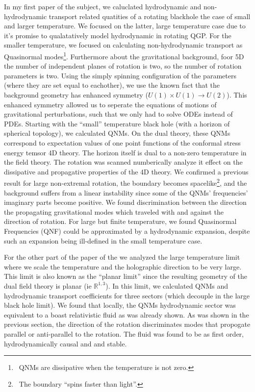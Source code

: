 \documentclass[12pt]{article}
\begin{document}
In my first paper of the subject, we caluclated hydrodynamic and non-hydrodynamic transport related quatities of a rotating blackhole the case of small and larger temperature.
We focused on the latter, large temperature case due to it's promise to qualatatively model hydrodynamic in rotating QGP.
For the smaller temperature, we focused on calculating non-hydrodynamic transport as Quasinormal modes\footnote{\
  QNMs are dissipative when the temperature is not zero.
}.
Furthermore about the gravitational background, foor 5D the number of independent planes of rotation is two, so the number of rotation parameters is two.
Using the simply spinning configuration of the parameters (where they are set equal to eachother), we use the known fact that the background geometry has enhanced symmetry ($U(1)\times U(1) \rightarrow U(2)$).
This enhanced symmetry allowed us to seperate the equations of motions of gravitational perturbations, such that we only had to solve ODEs instead of PDEs.
Starting with the ``small'' temperature black hole (with a horizon of spherical topology), we calculated QNMs.
On the dual theory, these QNMs correspond to expectation values of one point functions of the conformal stress energy temsor 4D theory.
The horizon itself is dual to a non-zero temperature in the field theory.
The rotation was scanned numberically analyze it effect on the dissipative and propagative properties of the 4D theory.
We confirmed a previous result for large non-extremal rotation, the boundary becomes spacelike\footnote{\
  The boundary ``spins faster than light''.
}, 
and the background suffers from a linear instability since some of the QNMs' frequencies' imaginary parts become positive.
We found discrimination between the direction the propagating gravitational modes which traveled with and against the direction of rotation.
For large but finite temperature, we found Quasinormal Frequencies (QNF) could be approximated by a hydrodynamic expansion, despite such an expansion being ill-defined in the small temperature case.

For the other part of the paper of the we analyzed the large temperature limit where we scale the temperature and the holographic direction to be very large.
This limit is also known as the ``planar limit'' since the resulting geometry of the dual field theory is planar (ie $\mathds{R}^{1,3}$). 
In this limit, we calculated QNMs and hydrodynamic transport coefficients for three sectors (which decouple in the large black hole limit).
We found that locally, the QNMs hydrodynamic sector was equivalent to a boast relativistic fluid as was already shown.
As was shown in the previous section, the direction of the rotation discriminates modes that propogate parallel or anti-parallel to the rotation.
The fluid was found to be as first order, hydrodynamically causal and and stable.
\end{document}
